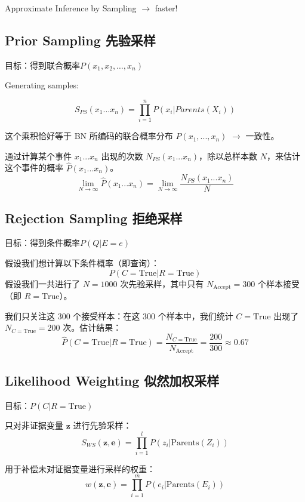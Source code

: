 \documentclass[11pt,a4paper]{article}
\begin{document}
Approximate Inference by Sampling \(\rightarrow\) faster!

\subsection{Prior Sampling 先验采样}\label{prior-sampling-ux5148ux9a8cux91c7ux6837}

目标：得到联合概率\(P(x_1, x_2, \dots, x_n)\)

Generating samples:

\[S_{PS}(x_1...x_n) = \prod_{i=1}^{n} P(x_i|Parents(X_i))\]

这个乘积恰好等于 BN 所编码的联合概率分布 \(P(x_1,...,x_n)\) \(\rightarrow\) 一致性。

通过计算某个事件 \(x_1...x_n\) 出现的次数 \(N_{PS}(x_1...x_n)\)，除以总样本数 \(N\)，来估计这个事件的概率 \(\hat{P}(x_1...x_n)\)。 \[\lim_{N \to \infty} \hat{P}(x_1...x_n) = \lim_{N \to \infty} \frac{N_{PS}(x_1...x_n)}{N}\]

\subsection{Rejection Sampling 拒绝采样}\label{rejection-sampling-ux62d2ux7eddux91c7ux6837}

目标：得到条件概率\(P(Q|E=e)\)

假设我们想计算以下条件概率（即查询）：\[P(C=\text{True} | R=\text{True})\] 假设我们一共进行了 \(N=1000\) 次先验采样，其中只有 \(N_{\text{Accept}}=300\) 个样本接受（即 \(R=\text{True}\)）。

我们只关注这 300 个接受样本：在这 300 个样本中，我们统计 \(C=\text{True}\) 出现了 \(N_{C=\text{True}}=200\) 次。估计结果：\[\hat{P}(C=\text{True} | R=\text{True}) = \frac{N_{C=\text{True}}}{N_{\text{Accept}}} = \frac{200}{300} \approx 0.67\]

\subsection{Likelihood Weighting 似然加权采样}\label{likelihood-weighting-ux4f3cux7136ux52a0ux6743ux91c7ux6837}

目标：\(P(C | R=\text{True})\)

只对非证据变量 \(\mathbf{z}\) 进行先验采样： \[S_{WS}(\mathbf{z}, \mathbf{e}) = \prod_{i=1}^{l} P(z_i|\text{Parents}(Z_i))\]

用于补偿未对证据变量进行采样的权重： \[w(\mathbf{z}, \mathbf{e}) = \prod_{i=1}^{m} P(e_i|\text{Parents}(E_i))\]
\end{document}
